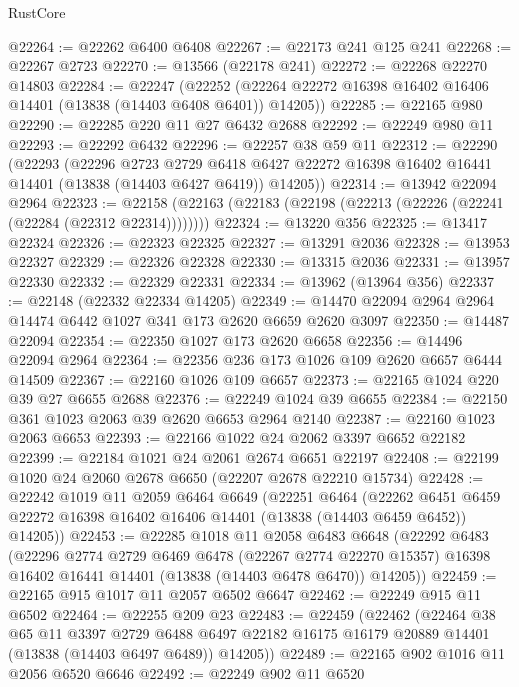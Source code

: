 \begin{lexlean}{RustCore}
\begin{coremodule}
@22264 := @22262 @6400 @6408
@22267 := @22173 @241 @125 @241
@22268 := @22267 @2723
@22270 := @13566 (@22178 @241)
@22272 := @22268 @22270 @14803
@22284 := @22247
    (@22252 (@22264 @22272 @16398 @16402 @16406 @14401 (@13838 (@14403 @6408 @6401)) @14205))
@22285 := @22165 @980
@22290 := @22285 @220 @11 @27 @6432 @2688
@22292 := @22249 @980 @11
@22293 := @22292 @6432
@22296 := @22257 @38 @59 @11
@22312 := @22290
    (@22293
      (@22296
        @2723
        @2729
        @6418
        @6427
        @22272
        @16398
        @16402
        @16441
        @14401
        (@13838 (@14403 @6427 @6419))
        @14205))
@22314 := @13942 @22094 @2964
@22323 := @22158 (@22163 (@22183 (@22198 (@22213 (@22226 (@22241 (@22284 (@22312 @22314))))))))
@22324 := @13220 @356
@22325 := @13417 @22324
@22326 := @22323 @22325
@22327 := @13291 @2036
@22328 := @13953 @22327
@22329 := @22326 @22328
@22330 := @13315 @2036
@22331 := @13957 @22330
@22332 := @22329 @22331
@22334 := @13962 (@13964 @356)
@22337 := @22148 (@22332 @22334 @14205)
@22349 := @14470 @22094 @2964 @2964 @14474 @6442 @1027 @341 @173 @2620 @6659 @2620 @3097
@22350 := @14487 @22094
@22354 := @22350 @1027 @173 @2620 @6658
@22356 := @14496 @22094 @2964
@22364 := @22356 @236 @173 @1026 @109 @2620 @6657 @6444 @14509
@22367 := @22160 @1026 @109 @6657
@22373 := @22165 @1024 @220 @39 @27 @6655 @2688
@22376 := @22249 @1024 @39 @6655
@22384 := @22150 @361 @1023 @2063 @39 @2620 @6653 @2964 @2140
@22387 := @22160 @1023 @2063 @6653
@22393 := @22166 @1022 @24 @2062 @3397 @6652 @22182
@22399 := @22184 @1021 @24 @2061 @2674 @6651 @22197
@22408 := @22199 @1020 @24 @2060 @2678 @6650 (@22207 @2678 @22210 @15734)
@22428 := @22242
    @1019
    @11
    @2059
    @6464
    @6649
    (@22251
      @6464
      (@22262 @6451 @6459 @22272 @16398 @16402 @16406 @14401 (@13838 (@14403 @6459 @6452)) @14205))
@22453 := @22285
    @1018
    @11
    @2058
    @6483
    @6648
    (@22292
      @6483
      (@22296
        @2774
        @2729
        @6469
        @6478
        (@22267 @2774 @22270 @15357)
        @16398
        @16402
        @16441
        @14401
        (@13838 (@14403 @6478 @6470))
        @14205))
@22459 := @22165 @915 @1017 @11 @2057 @6502 @6647
@22462 := @22249 @915 @11 @6502
@22464 := @22255 @209 @23
@22483 := @22459
    (@22462
      (@22464
        @38
        @65
        @11
        @3397
        @2729
        @6488
        @6497
        @22182
        @16175
        @16179
        @20889
        @14401
        (@13838 (@14403 @6497 @6489))
        @14205))
@22489 := @22165 @902 @1016 @11 @2056 @6520 @6646
@22492 := @22249 @902 @11 @6520

\end{coremodule}
\end{lexlean}
